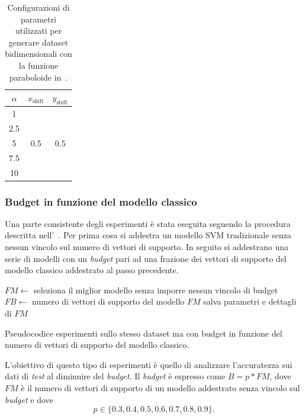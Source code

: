 \begin{table}
    \centering
    \begin{tabular}{ccc}
        \toprule
        $\alpha$ & $x_\text{shift}$ & $y_\text{shift}$ \\
        \midrule
        1   & \multirow{5}{*}{0.5} & \multirow{5}{*}{0.5} \\
        2.5 &\\
        5   &\\
        7.5 &\\
        10  &\\
        \bottomrule
    \end{tabular}
    \caption{Configurazioni di parametri utilizzati per generare dataset bidimensionali con la funzione paraboloide in~.}
    \label{tab:parametri_ds_pacman}
\end{table}

\subsubsection{Budget in funzione del modello classico}
Una parte consistente degli esperimenti è stata eseguita seguendo la procedura descritta nell'~.
Per prima cosa si addestra un modello SVM tradizionale senza nessun vincolo sul numero di vettori di supporto.
In seguito si addestrano una serie di modelli con un \emph{budget} pari ad una frazione dei vettori di supporto del modello classico addestrato al passo precedente.
\begin{algorithm}
    \SetAlgoLined
    $FM \gets$ seleziona il miglior modello senza imporre nessun vincolo di budget\;
    $FB \gets$ numero di vettori di supporto del modello $FM$\;
    salva parametri e dettagli di $FM$\;
\caption{Pseudocodice esperimenti sullo stesso dataset ma con budget in funzione del numero di vettori di supporto del modello classico.}
\label{alg:esperimenti_1}
\end{algorithm}
L'obiettivo di questo tipo di esperimenti è quello di analizzare l'accuratezza sui dati di \emph{test} al diminuire del \emph{budget}.
Il \emph{budget} è espresso come $B=p*FM$, dove $FM$ è il numero di vettori di supporto di un modello addestrato senza vincolo sul \emph{budget} e dove
\begin{equation*}
    p\in\{0.3, 0.4, 0.5, 0.6, 0.7, 0.8, 0.9\}.
\end{equation*}

